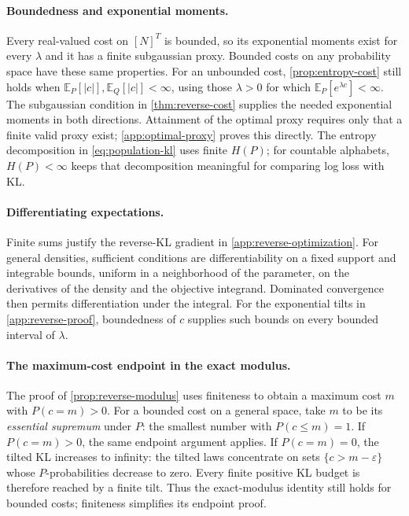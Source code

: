 \documentclass[11pt,twoside]{article}
\newcommand{\E}{\mathbb E}
\theoremstyle{definition}
\theoremstyle{remark}
\begin{document}
\paragraph{Boundedness and exponential moments.}
Every real-valued cost on \([N]^T\) is bounded, so its exponential moments
exist for every \(\lambda\) and it has a finite subgaussian proxy.
Bounded costs on any probability space have these same properties.
For an unbounded cost, \cref{prop:entropy-cost} still holds when
\(\E_P[|c|],\E_Q[|c|]<\infty\), using those
\(\lambda>0\) for which \(\E_P[e^{\lambda c}]<\infty\).
The subgaussian condition in \cref{thm:reverse-cost} supplies the needed
exponential moments in both directions. Attainment of the optimal proxy
requires only that a finite valid proxy exist; \cref{app:optimal-proxy}
proves this directly.
The entropy decomposition in \cref{eq:population-kl} uses finite
\(H(P)\); for countable alphabets, \(H(P)<\infty\) keeps that
decomposition meaningful for comparing log loss with KL.

\paragraph{Differentiating expectations.}
Finite sums justify the reverse-KL gradient in \cref{app:reverse-optimization}.
For general densities,
sufficient conditions are differentiability on a fixed support and
integrable bounds, uniform in a neighborhood of the parameter, on the
derivatives of the density and the objective integrand. Dominated
convergence then permits differentiation under the integral.
For the exponential tilts in \cref{app:reverse-proof}, boundedness of
\(c\) supplies such bounds on every bounded interval of \(\lambda\).

\paragraph{The maximum-cost endpoint in the exact modulus.}
The proof of \cref{prop:reverse-modulus} uses finiteness to obtain a
maximum cost \(m\) with \(P(c=m)>0\). For a bounded cost on a general
space, take \(m\) to be its \emph{essential supremum} under \(P\):
the smallest number with \(P(c\le m)=1\).
If \(P(c=m)>0\), the same endpoint argument applies. If
\(P(c=m)=0\), the tilted KL increases to infinity: the tilted laws
concentrate on sets \(\{c>m-\varepsilon\}\) whose \(P\)-probabilities
decrease to zero. Every finite positive KL budget is therefore reached
by a finite tilt. Thus the exact-modulus identity still holds for
bounded costs; finiteness simplifies its endpoint proof.
\end{document}
